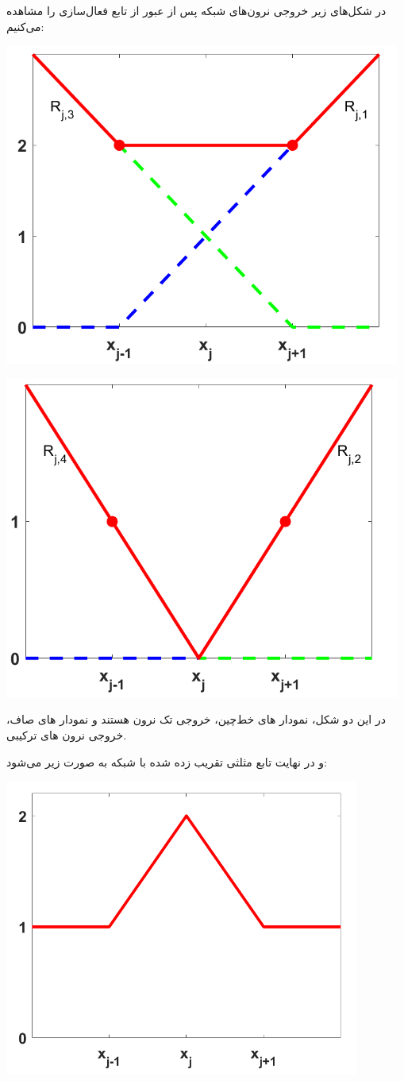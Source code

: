 \begin{qsolve}
	در شکل‌های زیر خروجی نرون‌های شبکه پس از عبور از تابع فعال‌سازی  را مشاهده می‌کنیم:
	
	\begin{center}
		\includegraphics*[width=0.5\linewidth]{pics/img11.png}
		\label{آ}
	\end{center}
	
	\begin{center}
		\includegraphics*[width=0.5\linewidth]{pics/img12.png}
		\label{ب}
	\end{center}

در این دو شکل، نمودار های خط‌چین، خروجی تک نرون هستند و نمودار های صاف، خروجی نرون های ترکیبی.

و در نهایت تابع مثلثی تقریب زده شده با شبکه  به صورت زیر می‌شود:


\end{qsolve}





\begin{qsolve}
	\begin{center}
		\includegraphics*[width=0.5\linewidth]{pics/img13.png}
		\label{شکل تقریب زده شده}
	\end{center}
\end{qsolve}









